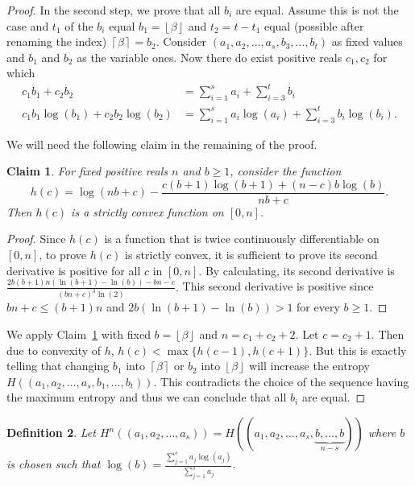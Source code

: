 \documentclass{article}
\newtheorem{defi}{Definition}
\newtheorem{claim}[defi]{Claim}
\newcommand*{\myproofname}{Proof}
\newenvironment{claimproof}[1][\myproofname]{\begin{proof}[#1]\renewcommand*{\qedsymbol}{\(\diamondsuit\)}}{\end{proof}}
\newcommand*{\bceil}[1]{\left\lceil #1\right\rceil}
\newcommand*{\bfloor}[1]{\left\lfloor #1\right\rfloor}
\def \b{\beta}
\begin{document}
{\begin{proof}
In the second step, we prove that all $b_i$ are equal.
Assume this is not the case and $t_1$ of the $b_i$ equal $b_1=\bfloor{\b}$ and $t_2=t-t_1$ equal (possible after renaming the index) $\bceil{\b}=b_2.$
Consider $(a_1,a_2,\ldots, a_{s},b_3,\ldots,b_{t})$ as fixed values and $b_1$ and $b_2$ as the variable ones.
Now there do exist positive reals $c_1, c_2$ for which
\begin{align*}
    c_1 b_1 + c_2 b_2 &= \sum_{i=1}^{s} a_i + \sum_{i=3}^{t} b_i \\
    c_1 b_1\log(b_1) + c_2 b_2\log(b_2) &= \sum_{i=1}^{s} a_i \log(a_i) + \sum_{i=3}^{t} b_i  \log(b_i).
\end{align*}

We will need the following claim in the remaining of the proof.
\begin{claim}\label{claim_convex_function}
    For fixed positive reals $n$ and $b\ge 1$, consider the function 
    $$ h(c)= \log( nb+c) - \frac{ c(b+1)\log(b+1) +(n-c) b\log(b)}{nb+c}.$$
    Then $h(c)$ is a strictly convex function on $[0,n].$
\end{claim}

\begin{claimproof}
Since $h(c)$ is a function that is twice continuously differentiable on $[0,n]$, to prove $h(c)$ is strictly convex, it is sufficient to prove its second derivative is positive for all $c$ in $[0,n]$. By calculating, its second derivative is $\frac{2b(b+1)n(\ln(b+1)-\ln(b))-bn-c}{(bn+c)^3\ln(2)}.$ 
This second derivative is positive since $bn+c \le (b+1)n$ and $2b(\ln(b+1)-\ln(b))>1$ for every $ b \ge 1$.
\end{claimproof}

We apply Claim~\ref{claim_convex_function} with fixed $b=\bfloor{\b}$ and $n=c_1+c_2+2$. Let $c=c_2+1.$ Then due to convexity of $h$, $h(c)<\max\{h(c-1),h(c+1)\}.$
But this is exactly telling that changing $b_1$ into $\bceil{\b}$ or $b_2$ into $\bfloor{\b}$ will increase the entropy $H((a_1,a_2, \ldots, a_s,b_1, \ldots, b_t)).$
This contradicts the choice of the sequence having the maximum entropy and thus we can conclude that all $b_i$ are equal. 
\end{proof}



\begin{defi}
    Let $H^n((a_1,a_2, \ldots, a_s))=H\left((a_1,a_2, \ldots, a_s,\underbrace{b, \ldots, b}_{n-s} )\right)$ where $b$ is chosen such that $\log(b) = \frac{ \sum_{j=1}^s a_j \log(a_j) }{ \sum_{j=1}^s a_j }.$
\end{defi}

}
\end{document}

